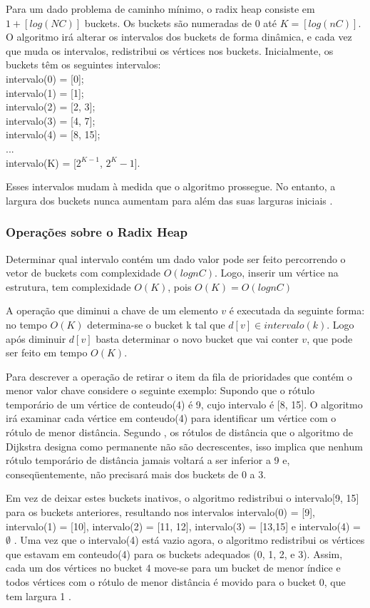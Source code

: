 Para um dado problema de caminho mínimo, o radix heap consiste em $1 + [log(NC)]$ buckets.
Os buckets são numeradas de $0$ até $K = [log(nC)]$.
O algoritmo irá alterar os intervalos dos buckets de forma dinâmica, e cada vez que muda os intervalos,
redistribui os vértices nos buckets. Inicialmente, os buckets têm os seguintes intervalos:\\
intervalo(0) = [0];\\
intervalo(1) = [1];\\
intervalo(2) = [2, 3];\\
intervalo(3) = [4, 7];\\
intervalo(4) = [8, 15];\\
...\\
intervalo(K) = [$2^{K - 1}$, $2^K - 1$].

Esses intervalos mudam à medida que o algoritmo prossegue. No entanto, a largura dos buckets nunca aumentam
para além das suas larguras iniciais \cite{bookahuja}.

\subsubsection{Operações sobre o Radix Heap}
Determinar qual intervalo contém um dado valor pode ser feito percorrendo o vetor de buckets com complexidade $O(lognC)$.
Logo, inserir um vértice na estrutura, tem complexidade $O(K)$, pois $O(K) = O(lognC)$

A operação que diminui a chave de um elemento $v$ é executada da seguinte forma: no tempo $O(K)$ determina-se
o bucket k tal que $d[v] \in intervalo(k)$. Logo após diminuir $d[v]$ basta determinar o novo bucket que vai conter
$v$, que pode ser feito em tempo $O(K)$.

Para descrever a operação de retirar o item da fila de prioridades que contém o menor valor chave considere o seguinte exemplo:
Supondo que o rótulo temporário de um vértice de conteudo(4) é 9, cujo intervalo é [8, 15].
O algoritmo irá examinar cada vértice em conteudo(4) para identificar um vértice com o rótulo de menor distância.
Segundo \cite{bookahuja}, os rótulos de distância que o algoritmo de Dijkstra designa como permanente não são decrescentes,
isso implica que nenhum rótulo temporário de distância jamais voltará
a ser inferior a 9 e, conseqüentemente, não precisará mais dos buckets de 0 a 3.

Em vez de deixar estes buckets inativos, o algoritmo redistribui o intervalo[9, 15]
para os buckets anteriores, resultando nos intervalos intervalo(0) = [9], intervalo(1) = [10],
intervalo(2) = [11, 12], intervalo(3) = [13,15] e intervalo(4) = $\emptyset$ . Uma vez que o intervalo(4)
está vazio agora, o algoritmo redistribui os vértices que estavam em conteudo(4) para os buckets adequados (0, 1, 2, e 3).
Assim, cada um dos vértices no bucket 4 move-se para um bucket de menor índice e todos vértices com o rótulo de menor distância
é movido para o bucket 0, que tem largura 1 \cite{bookahuja}.

